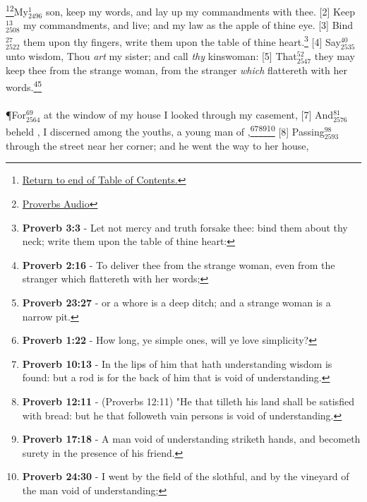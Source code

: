 \footnote{\textcolor[cmyk]{0.99998,1,0,0}{\hyperlink{TOC}{Return to end of Table of Contents.}}}\footnote{\href{https://audiobible.com/bible/bible.html}{\textcolor[cmyk]{0.99998,1,0,0}{Proverbs Audio}}}\textcolor[cmyk]{0.99998,1,0,0}{My\textcolor{jungle}{$_{2496}^{1}$} son, keep my words, and lay up my commandments with thee.}
[2] \textcolor[cmyk]{0.99998,1,0,0}{Keep\textcolor{jungle}{$_{2508}^{13}$} my commandments, and live; and my law as the apple of thine eye.}
[3] \textcolor[cmyk]{0.99998,1,0,0}{Bind\textcolor{jungle}{$_{2522}^{27}$} them upon thy fingers, write them upon the table of thine heart.}\footnote{\textbf{Proverb 3:3} - Let not mercy and truth forsake thee: bind them about thy neck; write them upon the table of thine heart:}
[4] \textcolor[cmyk]{0.99998,1,0,0}{Say\textcolor{jungle}{$_{2535}^{40}$} unto wisdom, Thou \emph{art} my sister; and call  \emph{thy} kinswoman:}
[5] \textcolor[cmyk]{0.99998,1,0,0}{That\textcolor{jungle}{$_{2547}^{52}$} they may keep thee from the strange woman, from the stranger \emph{which} flattereth with her words.}\footnote{\textbf{Proverb 2:16} - To deliver thee from the strange woman, even from the stranger which flattereth with her words; }\footnote{\textbf{Proverb 23:27} - or a whore is a deep ditch; and a strange woman is a narrow pit.}\\
\\
\P \textcolor[cmyk]{0.99998,1,0,0}{For\textcolor{jungle}{$_{2564}^{69}$} at the window of my house I looked through my casement,}
[7] \textcolor[cmyk]{0.99998,1,0,0}{And\textcolor{jungle}{$_{2576}^{81}$} beheld    , I discerned among the youths, a young man  of ,}\footnote{\textbf{Proverb 1:22} - How long, ye simple ones, will ye love simplicity?}\footnote{\textbf{Proverb 10:13} - In the lips of him that hath understanding wisdom is found: but a rod is for the back of him that is void of understanding.}\footnote{\textbf{Proverb 12:11} - (Proverbs 12:11) "He that tilleth his land shall be satisfied with bread: but he that followeth vain persons is void of understanding.}\footnote{\textbf{Proverb 17:18} - A man void of understanding striketh hands, and becometh surety in the presence of his friend.}\footnote{\textbf{Proverb 24:30} -  I went by the field of the slothful, and by the vineyard of the man void of understanding;}
[8] \textcolor[cmyk]{0.99998,1,0,0}{Passing\textcolor{jungle}{$_{2593}^{98}$} through the street near her corner; and he went the way to her house,}
